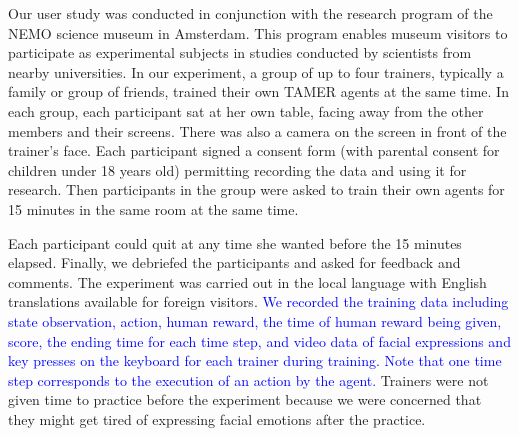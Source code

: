
Our user study was conducted in conjunction with the research program of the NEMO science museum in Amsterdam.  This program enables museum visitors to participate as experimental subjects in studies conducted by scientists from nearby universities.  In our experiment, a group of up to four trainers, typically a family or group of friends, trained their own TAMER agents at the same time. In each group, each participant sat at her own table, facing away from the other members and their screens. There was also a camera on the screen in front of the trainer's face. Each participant signed a consent form (with parental consent for children under 18 years old) permitting recording the data and using it for research.
Then participants in the group were asked to train their own agents for 15 minutes in the same room at the same time. 

Each participant could quit at any time she wanted before the 15 minutes elapsed. Finally, we debriefed the participants and asked for feedback and comments. The experiment was carried out in the local language with English translations available for foreign visitors. \textcolor{blue}{We recorded the training data including state observation, action, human reward, the time of human reward being given, score, the ending time for each time step, and video data of facial expressions and key presses on the keyboard for each trainer during training. Note that one time step corresponds to the execution of an action by the agent. %
} 
Trainers were not given time to practice before the experiment because we were concerned that they might get tired of expressing facial emotions after the practice.



